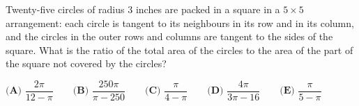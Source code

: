 Twenty-five circles of radius $3$ inches are packed in a square in a $5\times5$ arrangement: each circle is tangent to its neighbours in its row and in its column, and the circles in the outer rows and columns are tangent to the sides of the square. What is the ratio of the total area of the circles to the area of the part of the square not covered by the circles?

$\textbf{(A) }\dfrac{2\pi}{12-\pi}\qquad\textbf{(B) }\dfrac{250\pi}{\pi-250}\qquad\textbf{(C) }\dfrac{\pi}{4-\pi}\qquad\textbf{(D) }\dfrac{4\pi}{3\pi-16}\qquad\textbf{(E) }\dfrac{\pi}{5-\pi}$
